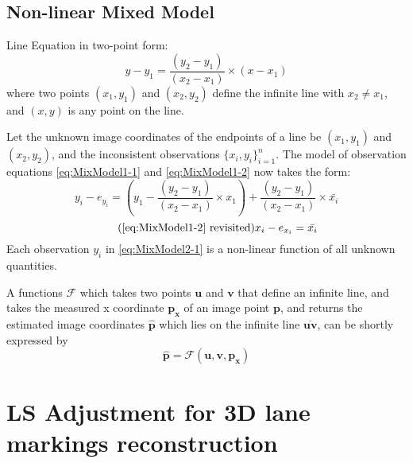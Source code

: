 \subsection{Non-linear Mixed Model}
\label{subsec:NonLinear}

Line Equation in two-point form:
\begin{equation} \label{eq:LineInTwoPointForm}
y-y_1 = \dfrac{(y_2-y_1)}{(x_2-x_1)}\times(x-x_1)
\end{equation}
where two points $(x_1,y_1)$ and $(x_2,y_2)$ define the infinite line with $x_2\neq x_1$, and $(x,y)$ is any point on the line.

Let the unknown image coordinates of the endpoints of a line be $(x_1,y_1)$ and $(x_2,y_2)$, and the inconsistent observations $\{x_i,y_i\}^n_{i=1}$. The model of observation equations \eqref{eq:MixModel1-1} and \eqref{eq:MixModel1-2} now takes the form: 
\begin{equation} \label{eq:MixModel2-1}
y_i - e_{y_i}= (y_1-\dfrac{(y_2-y_1)}{(x_2-x_1)}\times x_1) + \dfrac{(y_2-y_1)}{(x_2-x_1)}\times \bar{x_i}
\end{equation}
\begin{equation} \tag{\ref{eq:MixModel1-2} revisited}
x_i-e_{x_i} = \bar{x_i}
\end{equation}
Each observation $y_i$ in \eqref{eq:MixModel2-1} is a non-linear function of all unknown quantities.

A functions $\mathcal{F}$ which takes two points $\mathbf{u}$ and $\mathbf{v}$ that define an infinite line, and takes the measured x coordinate $\mathbf{p_x}$ of an image point $\mathbf{p}$, and returns the estimated image coordinates $\mathbf{\hat{p}}$ which lies on the infinite line $\overline{\mathbf{u}\mathbf{v}}$, can be shortly expressed by
\begin{equation} \label{eq:Ffunction}
\mathbf{\hat{p}} = \mathcal{F}(\mathbf{u},\mathbf{v},\mathbf{p_x}) 
\end{equation}




\clearpage
\section{LS Adjustment for 3D lane markings reconstruction}
\label{sec:LSadj}

